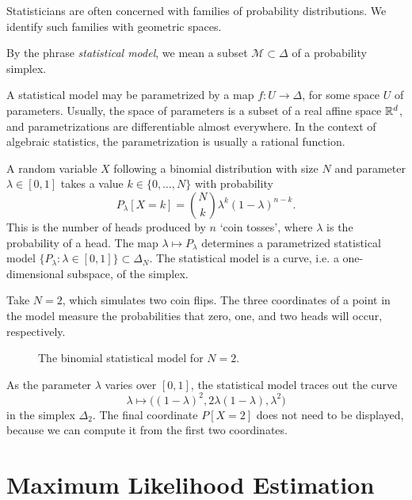 \documentclass[cclicense]{hmcthesis}
\newcommand*{\Mod}{\mathcal{M}}
\numberwithin{equation}{chapter}
\numberwithin{thmcounter}{chapter}
\begin{document}
    Statisticians are often concerned with families of probability
    distributions.  We identify such families with geometric spaces.
    \begin{definition}
    By the phrase \emph{statistical model}, we mean a subset $\Mod \subset
    \Delta$ of a probability simplex.
    \end{definition}
    \noindent A statistical model may be parametrized by a map $f: U \to
    \Delta$, for some space $U$ of parameters.  Usually, the space of parameters
    is a subset of a real affine space $\mathbb{R}^d$, and parametrizations are
    differentiable almost everywhere.  In the context of algebraic statistics,
    the parametrization is usually a rational function.
    \begin{example}
    A random variable $X$ following a binomial distribution with size $N$ and
    parameter $\lambda \in [0,1]$ takes a value $k \in \{0,\ldots, N\}$ with
    probability
    \[
        P_\lambda[X = k] = {N \choose k} \lambda^k(1-\lambda)^{n-k}.
    \]
    This is the number of heads produced by $n$ `coin tosses', where $\lambda$
    is the probability of a head.  The map $\lambda \mapsto P_\lambda$
    determines a parametrized statistical model $\{P_\lambda : \lambda \in [0,1]
    \} \subset \Delta_N$. The statistical model is a curve, i.e. a
    one-dimensional subspace, of the simplex.  

    Take $N=2$, which simulates two coin flips.  The three coordinates of a
    point in the model measure the probabilities that zero, one, and two heads
    will occur, respectively.
    \begin{figure}[H]\label{fig:binomial}
        \centering
        \vspace*{-0.2cm}
        \vspace*{-0.5cm}
        \caption{The binomial statistical model for $N=2$.}
    \end{figure}
    \noindent As the parameter $\lambda$ varies over $[0,1]$, the statistical
    model traces out the curve 
    \[
        \lambda \longmapsto \big((1-\lambda)^2, 2\lambda(1-\lambda), \lambda^2\big)
    \]
    in the simplex $\Delta_2$.  The final coordinate
    $P[X=2]$ does not need to be displayed, because we can compute it from the
    first two coordinates.  
    \end{example}
    
\section{Maximum Likelihood Estimation}
\end{document}
